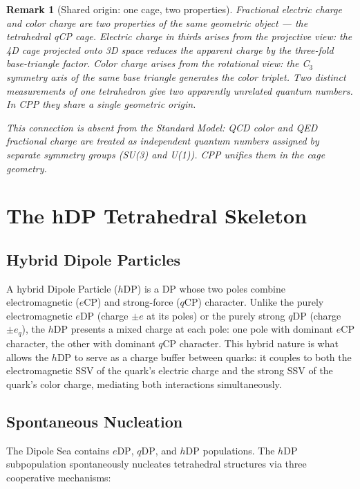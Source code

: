 \documentclass[12pt]{article}
\newtheorem{remark}[theorem]{Remark}
\newcommand{\eCP}{e\mathrm{CP}}
\newcommand{\qCP}{q\mathrm{CP}}
\newcommand{\eDP}{e\mathrm{DP}}
\newcommand{\qDP}{q\mathrm{DP}}
\newcommand{\hDP}{h\mathrm{DP}}
\begin{document}
\begin{remark}[Shared origin: one cage, two properties]
\label{rem:shared_origin}
Fractional electric charge and color charge are two properties of
the same geometric object --- the tetrahedral qCP cage.  Electric
charge in thirds arises from the projective view: the 4D cage
projected onto 3D space reduces the apparent charge by the
three-fold base-triangle factor.  Color charge arises from the
rotational view: the C$_3$ symmetry axis of the same base triangle
generates the color triplet.  Two distinct measurements of one
tetrahedron give two apparently unrelated quantum numbers.  In CPP
they share a single geometric origin.

This connection is absent from the Standard Model: QCD color and
QED fractional charge are treated as independent quantum numbers
assigned by separate symmetry groups (SU(3) and U(1)).  CPP
unifies them in the cage geometry.
\end{remark}

\section{The hDP Tetrahedral Skeleton}
\label{sec:hdp}

\subsection{Hybrid Dipole Particles}

A hybrid Dipole Particle ($\hDP$) is a DP whose two poles combine
electromagnetic ($\eCP$) and strong-force ($\qCP$) character.
Unlike the purely electromagnetic $\eDP$ (charge $\pm e$ at its
poles) or the purely strong $\qDP$ (charge $\pm e_q$), the $\hDP$
presents a mixed charge at each pole: one pole with dominant $\eCP$
character, the other with dominant $\qCP$ character.  This hybrid
nature is what allows the $\hDP$ to serve as a charge buffer between
quarks: it couples to both the electromagnetic SSV of the quark's
electric charge and the strong SSV of the quark's color charge,
mediating both interactions simultaneously.

\subsection{Spontaneous Nucleation}

The Dipole Sea contains $\eDP$, $\qDP$, and $\hDP$ populations.
The $\hDP$ subpopulation spontaneously nucleates tetrahedral
structures via three cooperative mechanisms:
\end{document}

